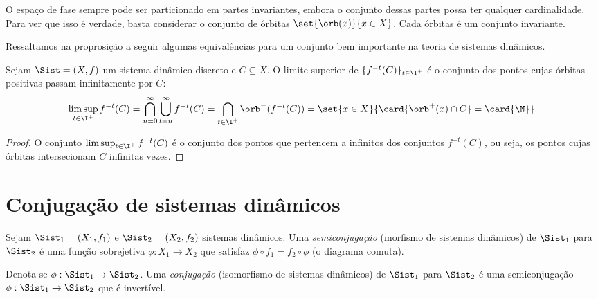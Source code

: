 O espaço de fase sempre pode ser particionado em partes invariantes, embora o conjunto dessas partes possa ter qualquer cardinalidade. Para ver que isso é verdade, basta considerar o conjunto de órbitas $\set{\orb(x)}{x \in X}$. Cada órbitas é um conjunto invariante.

Ressaltamos na proprosição a seguir algumas equivalências para um conjunto bem importante na teoria de sistemas dinâmicos.

\begin{proposition}
Sejam $\Sist=(X,f)$ um sistema dinâmico discreto e $C \subseteq X$. O limite superior de $\{f^{-t}(C)\}_{t \in \I^+}$ é o conjunto dos pontos cujas órbitas positivas passam infinitamente por $C$:
		\begin{equation*}
		\limsup_{t \in \I^+} f^{-t}(C) = \bigcap_{n=0}^\infty\bigcup_{t=n}^\infty f^{-t}(C) = \bigcap_{t \in \I^+} \orb^-(f^{-t}(C)) = \set{x \in X}{\card{\orb^+(x) \cap C} = \card{\N}}.
		\end{equation*}
\end{proposition}
\begin{proof}
O conjunto $\limsup_{t \in \I^+} f^{-t}(C)$ é o conjunto dos pontos que pertencem a infinitos dos conjuntos $f^{-t}(C)$, ou seja, os pontos cujas órbitas intersecionam $C$ infinitas vezes.
\end{proof}

\section{Conjugação de sistemas dinâmicos}

\begin{definition}
Sejam $\Sist_1 = (X_1,f_1)$ e $\Sist_2 = (X_2,f_2)$ sistemas dinâmicos. Uma \emph{semiconjugação} (morfismo de sistemas dinâmicos) de $\Sist_1$ para $\Sist_2$ é uma função sobrejetiva $\phi: X_1 \to X_2$ que satisfaz $\phi \circ f_1 = f_2 \circ \phi$ (o diagrama comuta).
\begin{figure}
\centering
{}
\end{figure}
\noindent Denota-se $\phi: \Sist_1 \to \Sist_2$. Uma \emph{conjugação} (isomorfismo de sistemas dinâmicos) de $\Sist_1$ para $\Sist_2$ é uma semiconjugação $\phi: \Sist_1 \to \Sist_2$ que é invertível.
\end{definition}

